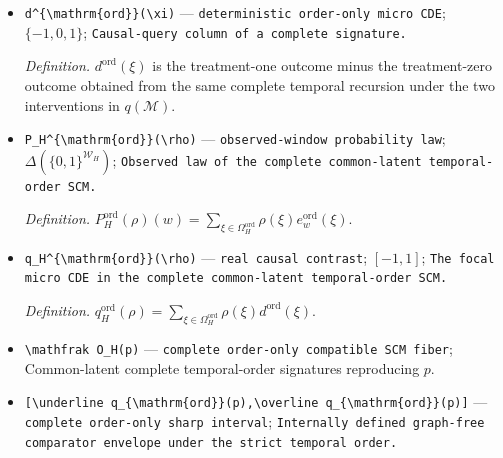 \documentclass{article}
\begin{document}
\begin{itemize}
  \par\smallskip\noindent\emph{Definition.} For \(w\in\{0,1\}^{\mathcal W_H}\), \(e_w^{\mathrm{ord}}(\xi)=1\) exactly when the temporal recursion \(V_v=g_{v,\xi}((V_a)_{a\in\operatorname{Pred}_H(v)})\) returns \(w\).
  \item \texttt{d\textasciicircum{}\{\textbackslash{}\allowbreak{}mathrm\{ord\}\allowbreak{}\}\allowbreak{}(\textbackslash{}\allowbreak{}xi)} --- \texttt{deterministic order-\allowbreak{}only micro CDE}; \(\{-1,0,1\}\); \texttt{Causal-\allowbreak{}query column of a complete signature.}
  \par\smallskip\noindent\emph{Definition.} \(d^{\mathrm{ord}}(\xi)\) is the treatment-one outcome minus the treatment-zero outcome obtained from the same complete temporal recursion under the two interventions in \(q(\mathcal M)\).
  \item \texttt{P\_\allowbreak{}H\textasciicircum{}\{\textbackslash{}\allowbreak{}mathrm\{ord\}\allowbreak{}\}\allowbreak{}(\textbackslash{}\allowbreak{}rho)} --- \texttt{observed-\allowbreak{}window probability law}; \(\Delta(\{0,1\}^{\mathcal W_H})\); \texttt{Observed law of the complete common-\allowbreak{}latent temporal-\allowbreak{}order SCM.}
  \par\smallskip\noindent\emph{Definition.} \(P_H^{\mathrm{ord}}(\rho)(w)=\sum_{\xi\in\Omega_H^{\mathrm{ord}}}\rho(\xi)e_w^{\mathrm{ord}}(\xi)\).
  \item \texttt{q\_\allowbreak{}H\textasciicircum{}\{\textbackslash{}\allowbreak{}mathrm\{ord\}\allowbreak{}\}\allowbreak{}(\textbackslash{}\allowbreak{}rho)} --- \texttt{real causal contrast}; \([-1,1]\); \texttt{The focal micro CDE in the complete common-\allowbreak{}latent temporal-\allowbreak{}order SCM.}
  \par\smallskip\noindent\emph{Definition.} \(q_H^{\mathrm{ord}}(\rho)=\sum_{\xi\in\Omega_H^{\mathrm{ord}}}\rho(\xi)d^{\mathrm{ord}}(\xi)\).
  \item \texttt{\textbackslash{}\allowbreak{}mathfrak O\_\allowbreak{}H(p)} --- \texttt{complete order-\allowbreak{}only compatible SCM fiber}; Common-latent complete temporal-order signatures reproducing \(p\).
  \item \texttt{[\textbackslash{}\allowbreak{}underline q\_\allowbreak{}\{\textbackslash{}\allowbreak{}mathrm\{ord\}\allowbreak{}\}\allowbreak{}(p),\allowbreak{}\textbackslash{}\allowbreak{}overline q\_\allowbreak{}\{\textbackslash{}\allowbreak{}mathrm\{ord\}\allowbreak{}\}\allowbreak{}(p)]} --- \texttt{complete order-\allowbreak{}only sharp interval}; \texttt{Internally defined graph-\allowbreak{}free comparator envelope under the strict temporal order.}

\end{itemize}
\end{document}
